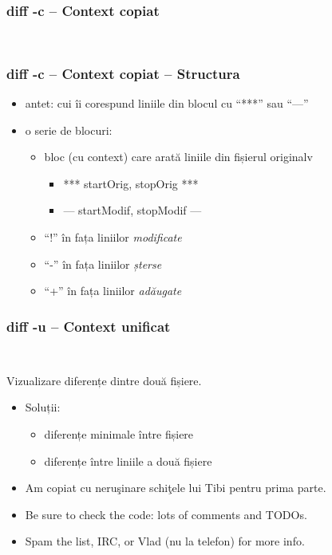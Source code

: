 \documentclass{beamer}
\begin{document}
\begin{frame}
  \frametitle{\textbf{diff -c} – Context copiat}
  \footnotesize \tt 
\end{frame}

\begin{frame}
  \frametitle{\textbf{diff -c} – Context copiat – Structura}
  \begin{itemize}
    \item antet: cui îi corespund liniile din blocul cu ``***'' sau ``---''
    \item o serie de blocuri:
      \begin{itemize}
        \item bloc (cu context) care arată liniile din fișierul originalv
          \begin{itemize} 
          \item *** startOrig, stopOrig ***
          \item --- startModif, stopModif ---
          \end{itemize}
        \item ``!'' în fața liniilor \textit{modificate}
        \item ``-'' în fața liniilor \textit{șterse}
        \item ``+'' în fața liniilor \textit{adăugate}
      \end{itemize}
  \end{itemize}
\end{frame}

\begin{frame}
  \frametitle{\textbf{diff -u} – Context unificat}
  \tt{}
\end{frame}


\begin{frame}{Vizualizare diferențe dintre două fișiere.}
\begin{itemize} %
\item Soluții:
  \begin{itemize}
  \item diferențe minimale între fișiere
  \item diferențe între liniile a două fișiere
  \end{itemize}
\item Am copiat cu neruşinare schiţele lui Tibi pentru prima parte.
\item Be sure to check the code: lots of comments and TODOs.
\item Spam the list, IRC, or Vlad (nu la telefon) for more info.
\end{itemize}
\end{frame}
\end{document}
